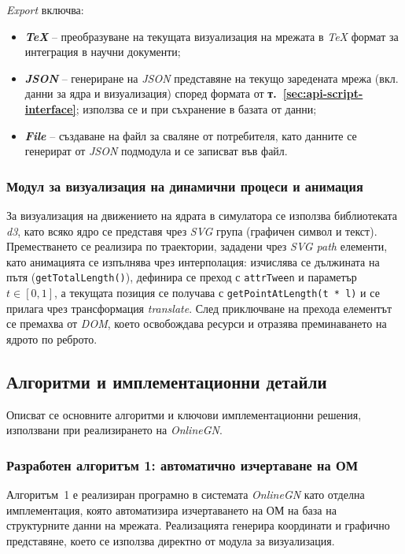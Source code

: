 \textit{Export} включва:
\vspace{-0.15cm}
\begin{itemize}
    \item \textbf{\textit{TeX}} -- преобразуване на текущата визуализация на мрежата в \textit{TeX} формат за интеграция в научни документи;
    \item \textbf{\textit{JSON}} -- генериране на \textit{JSON} представяне на текущо заредената мрежа (вкл. данни за ядра и визуализация) според формата от \textbf{т.~\ref{sec:api-script-interface}}; използва се и при съхранение в базата от данни;
    \item \textbf{\textit{File}} -- създаване на файл за сваляне от потребителя, като данните се генерират от \textit{JSON} подмодула и се записват във файл.
\end{itemize}

\subsubsection{Модул за визуализация на динамични процеси и анимация}
\hspace*{2.5em}За визуализация на движението на ядрата в симулатора се използва библиотеката \textit{d3}, като всяко ядро се представя чрез \textit{SVG} група (графичен символ и текст). Преместването се реализира по траектории, зададени чрез \textit{SVG path} елементи, като анимацията се изпълнява чрез интерполация: изчислява се дължината на пътя (\texttt{getTotalLength()}), дефинира се преход с \texttt{attrTween} и параметър $t\in[0,1]$, а текущата позиция се получава с \texttt{getPointAtLength(t * l)} и се прилага чрез трансформация \textit{translate}. След приключване на прехода елементът се премахва от \textit{DOM}, което освобождава ресурси и отразява преминаването на ядрото по реброто.

\subsection{Алгоритми и имплементационни детайли}
\hspace*{2.5em}Описват се основните алгоритми и ключови имплементационни решения, използвани при реализирането на \textit{OnlineGN}.

\subsubsection{Разработен алгоритъм 1: автоматично изчертаване на ОМ}
\hspace*{2.5em}Алгоритъм~1 е реализиран програмно в системата \textit{OnlineGN} като отделна имплементация, която автоматизира изчертаването на ОМ на база на структурните данни на мрежата. Реализацията генерира координати и графично представяне, което се използва директно от модула за визуализация.


